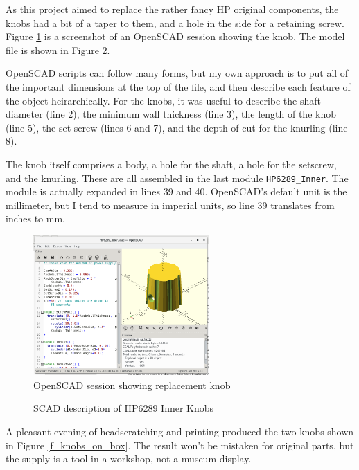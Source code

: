 \documentclass[12pt]{article}
\begin{document}
As this project aimed to replace the rather fancy HP original components,
the knobs had a bit of a taper to them, and a hole in the side for a
retaining screw. Figure \ref{f_openscad} is a screenshot of an OpenSCAD
session showing the knob. The model file is shown in Figure \ref{f_knob_list}.

OpenSCAD scripts can follow many forms, but my own approach is to put
all of the important dimensions at the top of the file, and then
describe each feature of the object heirarchically.  For the knobs,
it was useful to describe the shaft diameter (line 2), 
the minimum wall thickness (line 3), the length of the knob (line 5),
the set screw (lines 6 and 7), and the depth of cut for the knurling (line 8).

The knob itself comprises a body, a hole for the shaft, a hole for the
setscrew, and the knurling.  These are all assembled in the last module
{\tt HP6289\_Inner}. The module is actually expanded in lines 39 and 40.
OpenSCAD's default unit is the millimeter, but I tend to measure in
imperial units, so line 39 translates from inches to mm. 

\begin{figure}[tb]
  \centering
  \includegraphics[width=0.6\textwidth]{PSKnob_OpenSCAD.png}
  \caption{\label{f_openscad}OpenSCAD session showing replacement knob}
\end{figure}


\begin{figure}[tb]

\caption{\label{f_knob_list}SCAD description of HP6289 Inner Knobs}
\end{figure}

A pleasant evening of headscratching and printing produced the two knobs
shown in Figure \ref{f_knobs_on_box}.  The result won't be mistaken for
original parts, but the supply is a tool in a workshop, not a museum display. 
\end{document}
